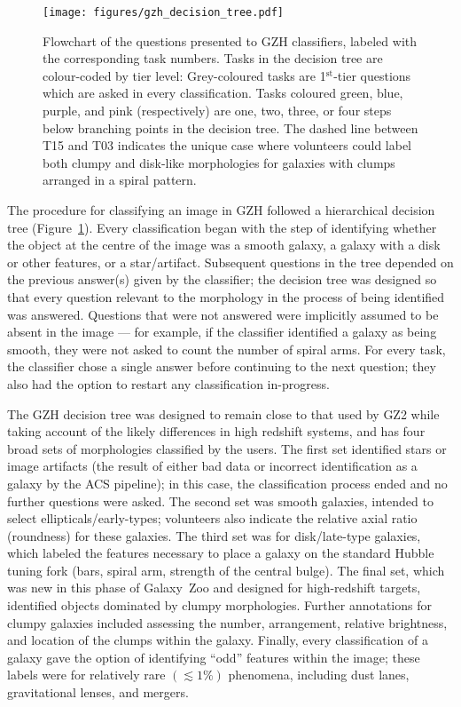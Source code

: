 \documentclass[a4paper,fleqn,usenatbib]{mnras}
\begin{document}
\begin{figure}
\center
\texttt{[image: figures/gzh\_decision\_tree.pdf]}
\caption{Flowchart of the questions presented to GZH classifiers, labeled with
the corresponding task numbers. Tasks in the decision tree are colour-coded by
tier level: Grey-coloured tasks are 1$^\mathrm{st}$-tier questions which are
asked in every classification. Tasks coloured green, blue, purple, and pink
(respectively) are one, two, three, or four steps below branching points in the
decision tree. The dashed line between T15 and T03 indicates the unique case
where volunteers could label both clumpy and disk-like morphologies for
galaxies with clumps arranged in a spiral pattern.}
\label{fig:decisiontree}
\end{figure}

The procedure for classifying an image in GZH followed a hierarchical decision
tree (Figure~\ref{fig:decisiontree}). Every classification began with the step of
identifying whether the object at the centre of the image was a smooth galaxy,
a galaxy with a disk or other features, or a star/artifact. Subsequent
questions in the tree depended on the previous answer(s) given by the classifier; the
decision tree was designed so that every question relevant to
the morphology in the process of being identified was answered. Questions that were not
answered were implicitly assumed to be absent in the image --- for example, if
the classifier identified a galaxy as being smooth, they were not asked to count the
number of spiral arms. For every task, the classifier chose a single answer before
continuing to the next question; they also had the option to restart any
classification in-progress. 

The GZH decision tree was designed to remain close to that used by GZ2 while
taking account of the likely differences in high redshift systems, and has four
broad sets of morphologies classified by the users.  The first set
identified stars or image artifacts (the result of either bad data or incorrect
identification as a galaxy by the ACS pipeline); in this case, the
classification process ended and no further questions were asked. The second
set was smooth galaxies, intended to select ellipticals/early-types;
volunteers also indicate the relative axial ratio (roundness) for these
galaxies. The third set was for disk/late-type galaxies, which labeled the
features necessary to place a galaxy on the standard Hubble tuning fork (bars,
spiral arm, strength of the central bulge). The final set, which was new in
this phase of Galaxy~Zoo and designed for high-redshift targets, identified
objects dominated by clumpy morphologies. Further annotations for clumpy
galaxies included assessing the number, arrangement, relative brightness, and
location of the clumps within the galaxy. Finally, every classification of a
galaxy gave the option of identifying ``odd'' features within the image; these
labels were for relatively rare $(\lesssim1\%)$ phenomena, including dust
lanes, gravitational lenses, and mergers. 
\end{document}
